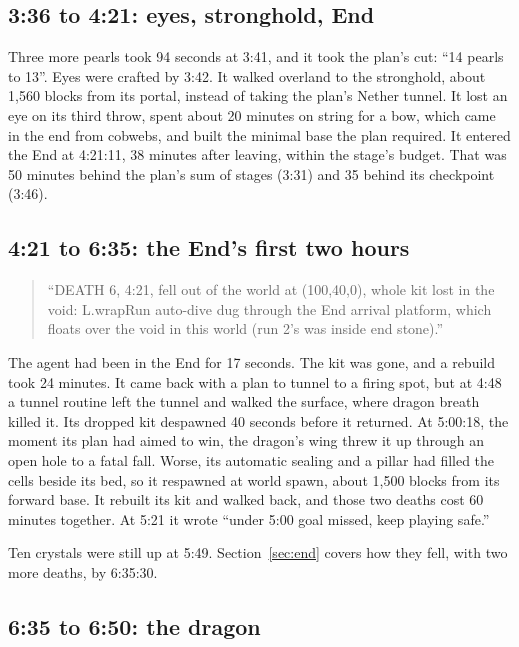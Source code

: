 \documentclass[11pt,a4paper]{article}
\begin{document}
\subsection{3:36 to 4:21: eyes, stronghold, End}

Three more pearls took 94 seconds at 3:41, and it took the plan's cut: ``14 pearls to 13''. Eyes were crafted by 3:42. It walked overland to the stronghold, about 1,560 blocks from its portal, instead of taking the plan's Nether tunnel. It lost an eye on its third throw, spent about 20 minutes on string for a bow, which came in the end from cobwebs, and built the minimal base the plan required. It entered the End at 4:21:11, 38 minutes after leaving, within the stage's budget. That was 50 minutes behind the plan's sum of stages (3:31) and 35 behind its checkpoint (3:46).

\subsection{4:21 to 6:35: the End's first two hours}

\begin{quote}
``DEATH 6, 4:21, fell out of the world at (100,40,0), whole kit lost in the void: L.wrapRun auto-dive dug through the End arrival platform, which floats over the void in this world (run 2's was inside end stone).''
\end{quote}

The agent had been in the End for 17 seconds. The kit was gone, and a rebuild took 24 minutes. It came back with a plan to tunnel to a firing spot, but at 4:48 a tunnel routine left the tunnel and walked the surface, where dragon breath killed it. Its dropped kit despawned 40 seconds before it returned. At 5:00:18, the moment its plan had aimed to win, the dragon's wing threw it up through an open hole to a fatal fall. Worse, its automatic sealing and a pillar had filled the cells beside its bed, so it respawned at world spawn, about 1,500 blocks from its forward base. It rebuilt its kit and walked back, and those two deaths cost 60 minutes together. At 5:21 it wrote ``under 5:00 goal missed, keep playing safe.''

Ten crystals were still up at 5:49. Section~\ref{sec:end} covers how they fell, with two more deaths, by 6:35:30.

\subsection{6:35 to 6:50: the dragon}
\end{document}
